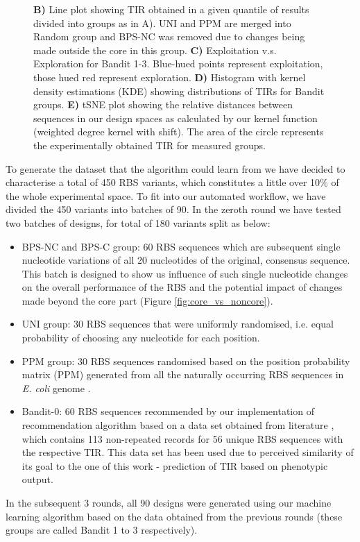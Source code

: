 \documentclass{article}
\newcommand{\mengyan}[1]{\textcolor{magenta}{#1}}
\begin{document}
\begin{figure}[!ht]
{    \textbf{B)} Line plot showing TIR obtained in a given quantile of results divided into groups as in A).
    UNI and PPM are merged into Random group and BPS-NC was removed due to changes being made outside the core in this group. 
    \textbf{C)} Exploitation v.s. Exploration for Bandit 1-3. Blue-hued points represent exploitation, those hued red represent exploration. 
    \textbf{D)} Histogram with kernel density estimations (KDE) showing distributions of TIRs for Bandit groups.
    \textbf{E)} tSNE plot showing the relative distances between sequences in our design spaces as calculated by our kernel function (weighted degree kernel with shift). 
    The area of the circle represents the experimentally obtained TIR for measured groups.}
    \label{fig: Swarmplot and Quantplot}
\end{figure}

To generate the dataset that the algorithm could learn from we have decided to characterise a total of 450 RBS variants, which constitutes a little over 10\% of the whole experimental space. 
To fit into our automated workflow, we have divided the 450 variants into batches of 90.
In the zeroth round we have tested two batches of designs, for total of 180 variants split as below: 
\begin{itemize}
    \item BPS-NC and BPS-C group: 60 RBS sequences which are subsequent single nucleotide variations of all 20 nucleotides of the original, consensus sequence. This batch is designed to show us influence of such single nucleotide changes on the overall performance of the RBS and the potential impact of changes made beyond the core part (Figure \ref{fig:core_vs_noncore}).
    \item UNI group: 30 RBS sequences that were  uniformly randomised, i.e. equal probability of choosing any nucleotide for each position. 
    \item PPM group: 30 RBS sequences randomised based on the position probability matrix (PPM) generated from all the naturally occurring RBS sequences in \emph{E. coli} genome \cite{Stormo1982}.
    \item Bandit-0: 60 RBS sequences recommended by our implementation of recommendation algorithm based on a data set obtained from literature \cite{jervis2018machine}, which contains 113 non-repeated records for 56 unique RBS sequences with the respective TIR.
    This data set has been used due to perceived similarity of its goal to the one of this work - prediction of TIR based on phenotypic output.
\end{itemize}
In the subsequent 3 rounds, all 90 designs were generated using our machine learning algorithm based on the data obtained from the previous rounds (these groups are called Bandit 1 to 3 respectively).
\end{document}
